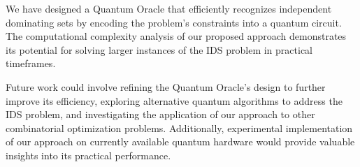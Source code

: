 We have designed a Quantum Oracle that efficiently recognizes independent dominating sets by encoding the problem's constraints into a quantum circuit. The computational complexity analysis of our proposed approach demonstrates its potential for solving larger instances of the IDS problem in practical timeframes.

Future work could involve refining the Quantum Oracle's design to further improve its efficiency, exploring alternative quantum algorithms to address the IDS problem, and investigating the application of our approach to other combinatorial optimization problems. Additionally, experimental implementation of our approach on currently available quantum hardware would provide valuable insights into its practical performance.

